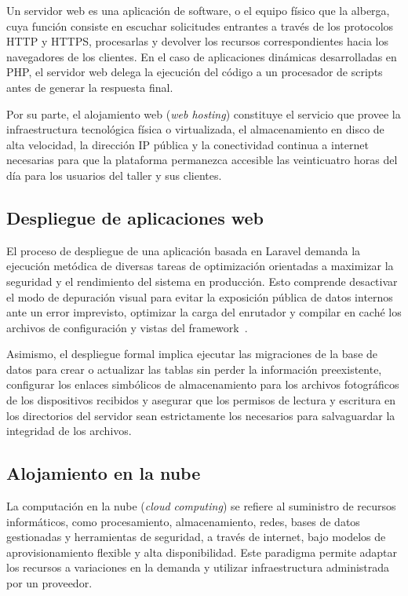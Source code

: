 Un servidor web es una aplicación de software, o el equipo físico que la alberga, cuya función consiste en escuchar solicitudes entrantes a través de los protocolos HTTP y HTTPS, procesarlas y devolver los recursos correspondientes hacia los navegadores de los clientes. En el caso de aplicaciones dinámicas desarrolladas en PHP, el servidor web delega la ejecución del código a un procesador de scripts antes de generar la respuesta final.

Por su parte, el alojamiento web (\textit{web hosting}) constituye el servicio que provee la infraestructura tecnológica física o virtualizada, el almacenamiento en disco de alta velocidad, la dirección IP pública y la conectividad continua a internet necesarias para que la plataforma permanezca accesible las veinticuatro horas del día para los usuarios del taller y sus clientes.

\subsection{Despliegue de aplicaciones web}

El proceso de despliegue de una aplicación basada en Laravel demanda la ejecución metódica de diversas tareas de optimización orientadas a maximizar la seguridad y el rendimiento del sistema en producción. Esto comprende desactivar el modo de depuración visual para evitar la exposición pública de datos internos ante un error imprevisto, optimizar la carga del enrutador y compilar en caché los archivos de configuración y vistas del framework~\cite{laravel_doc}.

Asimismo, el despliegue formal implica ejecutar las migraciones de la base de datos para crear o actualizar las tablas sin perder la información preexistente, configurar los enlaces simbólicos de almacenamiento para los archivos fotográficos de los dispositivos recibidos y asegurar que los permisos de lectura y escritura en los directorios del servidor sean estrictamente los necesarios para salvaguardar la integridad de los archivos.

\subsection{Alojamiento en la nube}

La computación en la nube (\textit{cloud computing}) se refiere al suministro de recursos informáticos, como procesamiento, almacenamiento, redes, bases de datos gestionadas y herramientas de seguridad, a través de internet, bajo modelos de aprovisionamiento flexible y alta disponibilidad. Este paradigma permite adaptar los recursos a variaciones en la demanda y utilizar infraestructura administrada por un proveedor.

